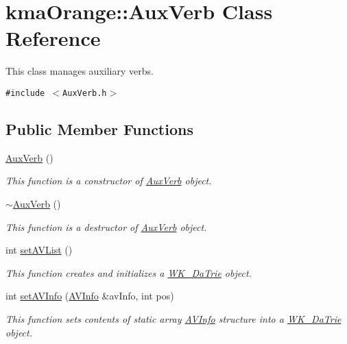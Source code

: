 \hypertarget{classkmaOrange_1_1AuxVerb}{
\section{kmaOrange::AuxVerb Class Reference}
\label{classkmaOrange_1_1AuxVerb}
}
This class manages auxiliary verbs.  


{\tt \#include $<$AuxVerb.h$>$}

\subsection*{Public Member Functions}
\begin{CompactItemize}
\item 
\hyperlink{classkmaOrange_1_1AuxVerb_6ecc7657f31bf369345acce2b227aa73}{AuxVerb} ()
\begin{CompactList}\small\item\em This function is a constructor of \hyperlink{classkmaOrange_1_1AuxVerb}{AuxVerb} object. \item\end{CompactList}\item 
\hyperlink{classkmaOrange_1_1AuxVerb_ed72d211dc28805844b0272cd80604e7}{$\sim$AuxVerb} ()
\begin{CompactList}\small\item\em This function is a destructor of \hyperlink{classkmaOrange_1_1AuxVerb}{AuxVerb} object. \item\end{CompactList}\item 
int \hyperlink{classkmaOrange_1_1AuxVerb_db8f3afc0ca17e2277c55661c7654a6b}{setAVList} ()
\begin{CompactList}\small\item\em This function creates and initializes a \hyperlink{classkmaOrange_1_1WK__DaTrie}{WK\_\-DaTrie} object. \item\end{CompactList}\item 
int \hyperlink{classkmaOrange_1_1AuxVerb_bb9f09a6080340f66463ed5ac8ee9681}{setAVInfo} (\hyperlink{structkmaOrange_1_1AVInfo}{AVInfo} \&avInfo, int pos)
\begin{CompactList}\small\item\em This function sets contents of static array \hyperlink{structkmaOrange_1_1AVInfo}{AVInfo} structure into a \hyperlink{classkmaOrange_1_1WK__DaTrie}{WK\_\-DaTrie} object. \item\end{CompactList}\item 

\end{CompactItemize}
